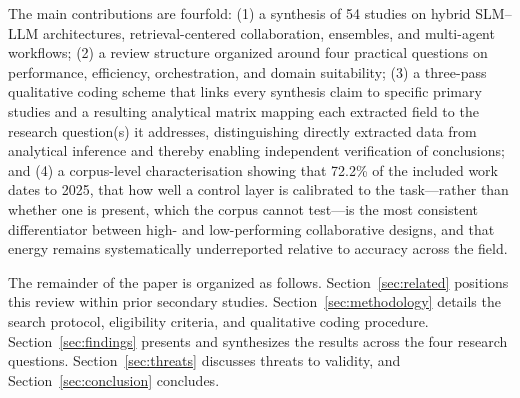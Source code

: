 The main contributions are fourfold: (1) a synthesis of 54 studies on hybrid SLM--LLM architectures, retrieval-centered collaboration, ensembles, and multi-agent workflows; (2) a review structure organized around four practical questions on performance, efficiency, orchestration, and domain suitability; (3) a three-pass qualitative coding scheme that links every synthesis claim to specific primary studies and a resulting analytical matrix mapping each extracted field to the research question(s) it addresses, distinguishing directly extracted data from analytical inference and thereby enabling independent verification of conclusions; and (4) a corpus-level characterisation showing that 72.2\% of the included work dates to 2025, that how well a control layer is calibrated to the task---rather than whether one is present, which the corpus cannot test---is the most consistent differentiator between high- and low-performing collaborative designs, and that energy remains systematically underreported relative to accuracy across the field.

The remainder of the paper is organized as follows. Section~\ref{sec:related} positions this review within prior secondary studies. Section~\ref{sec:methodology} details the search protocol, eligibility criteria, and qualitative coding procedure. Section~\ref{sec:findings} presents and synthesizes the results across the four research questions. Section~\ref{sec:threats} discusses threats to validity, and Section~\ref{sec:conclusion} concludes.
